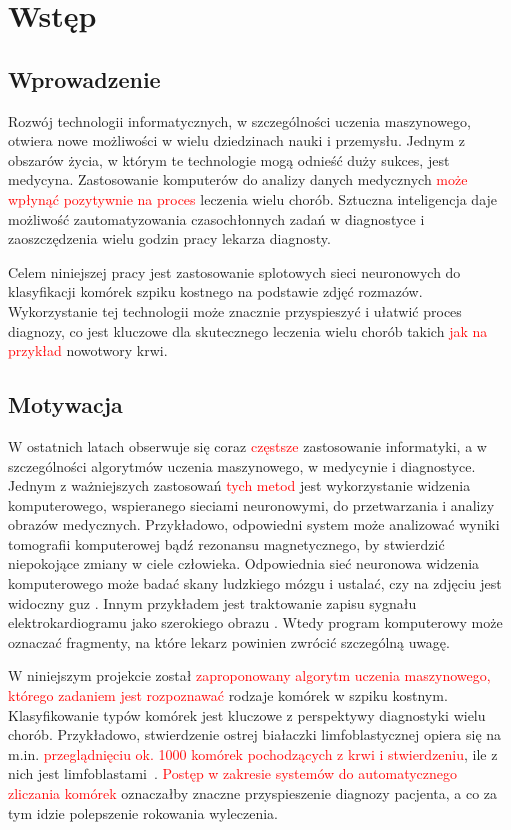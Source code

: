 \chapter{Wstęp}


\section{Wprowadzenie}

Rozwój technologii informatycznych, w szczególności uczenia maszynowego, otwiera nowe możliwości w wielu dziedzinach nauki i przemysłu.
Jednym z obszarów życia, w którym te technologie mogą odnieść duży sukces, jest medycyna.
Zastosowanie komputerów do analizy danych medycznych \textcolor{red}{może wpłynąć pozytywnie na proces} leczenia wielu chorób.
Sztuczna inteligencja daje możliwość zautomatyzowania czasochłonnych zadań w diagnostyce i zaoszczędzenia wielu godzin pracy lekarza diagnosty.

Celem niniejszej pracy jest zastosowanie splotowych sieci neuronowych do klasyfikacji komórek szpiku kostnego na podstawie zdjęć rozmazów.
Wykorzystanie tej technologii może znacznie przyspieszyć i ułatwić proces diagnozy, co jest kluczowe dla skutecznego leczenia wielu chorób takich \textcolor{red}{jak na przykład} nowotwory krwi.


\section{Motywacja}

W ostatnich latach obserwuje się coraz \textcolor{red}{częstsze} zastosowanie informatyki, a w szczególności algorytmów uczenia maszynowego,
w medycynie i diagnostyce.
Jednym z ważniejszych zastosowań \textcolor{red}{tych metod} jest wykorzystanie widzenia komputerowego, wspieranego sieciami neuronowymi, do przetwarzania i analizy obrazów medycznych.
Przykładowo, odpowiedni system może analizować wyniki tomografii komputerowej bądź rezonansu magnetycznego, by stwierdzić niepokojące zmiany w ciele człowieka.
Odpowiednia sieć neuronowa widzenia komputerowego może badać skany ludzkiego mózgu i ustalać, czy na zdjęciu jest widoczny guz \cite{brain_tumor}.
Innym przykładem jest traktowanie zapisu sygnału elektrokardiogramu jako szerokiego
obrazu \cite{ecg_cnn}.
Wtedy program komputerowy może oznaczać fragmenty, na które lekarz powinien zwrócić szczególną uwagę.

W niniejszym projekcie został \textcolor{red}{zaproponowany algorytm uczenia maszynowego, którego zadaniem jest rozpoznawać} rodzaje komórek w szpiku kostnym.
Klasyfikowanie typów komórek jest kluczowe z perspektywy diagnostyki wielu chorób.
Przykładowo, stwierdzenie ostrej białaczki limfoblastycznej opiera się na m.in.
\textcolor{red}{przeglądnięciu ok. 1000 komórek pochodzących z krwi i stwierdzeniu}, ile z nich jest limfoblastami~\cite{blast_counting_diagnosis}.
\textcolor{red}{Postęp w zakresie systemów do automatycznego zliczania komórek} oznaczałby znaczne przyspieszenie diagnozy pacjenta, a co za tym idzie polepszenie rokowania wyleczenia.

